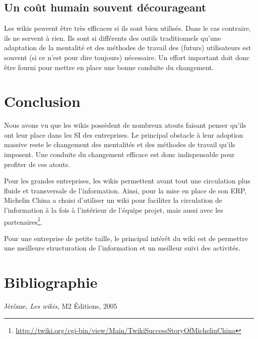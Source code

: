 \documentclass[pdftex,a4paper,11pt]{article}
\begin{document}
\subsection{Un coût humain souvent décourageant}
Les wikis peuvent être très efficaces si ils sont bien utilisés. Dans le cas contraire, ils ne servent à rien. Ils sont si différents des outils traditionnels qu'une adaptation de la mentalité et des méthodes de travail des (futurs) utilisateurs est souvent (si ce n'est pour dire toujours) nécessaire. Un effort important doit donc être fourni pour mettre en place une bonne conduite du changement.


\section*{Conclusion}
Nous avons vu que les wikis possèdent de nombreux atouts faisant penser qu'ils ont leur place dans les SI des entreprises. Le principal obstacle à leur adoption massive reste le changement des mentalités et des méthodes de travail qu'ils imposent. Une conduite du changement efficace est donc indispensable pour profiter de ces atouts.

Pour les grandes entreprises, les wikis permettent avant tout une circulation plus fluide et transversale de l'information. Ainsi, pour la mise en place de son ERP, Michelin China a choisi d'utiliser un wiki pour faciliter la circulation de l'information à la fois à l'intérieur de l'équipe projet, mais aussi avec les partenaires\footnote{\url{http://twiki.org/cgi-bin/view/Main/TwikiSuccessStoryOfMichelinChina}}.

Pour une entreprise de petite taille, le principal intérêt du wiki est de permettre une meilleure structuration de l'information et un meilleur suivi des activités.

\section*{Bibliographie}
 Jérôme, \emph{Les wikis}, M2 Éditions, 2005
\end{document}
